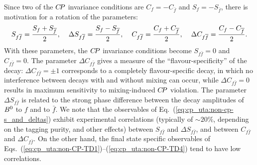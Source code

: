 Since two of the $C\!P$ invariance conditions are 
$C_f = - C_{\bar{f}}$ and $S_f = - S_{\bar{f}}$,
there is motivation for a rotation of the parameters:
\begin{equation}
\label{eq:cp_uta:non-cp-s_and_deltas}
  S_{f\bar{f}} = \frac{S_{f} + S_{\bar{f}}}{2},
  \hspace{4mm}
  \Delta S_{f\bar{f}} = \frac{S_{f} - S_{\bar{f}}}{2},
  \hspace{4mm}
  C_{f\bar{f}} = \frac{C_{f} + C_{\bar{f}}}{2},
  \hspace{4mm}
  \Delta C_{f\bar{f}} = \frac{C_{f} - C_{\bar{f}}}{2}.
\end{equation}
With these parameters, the $C\!P$ invariance conditions become
$S_{f\bar{f}} = 0$ and $C_{f\bar{f}} = 0$. 
The parameter $\Delta C_{f\bar{f}}$ gives a measure of the ``flavour-specificity''
of the decay:
$\Delta C_{f\bar{f}}=\pm1$ corresponds to a completely flavour-specific decay,
in which no interference between decays with and without mixing can occur,
while $\Delta C_{f\bar{f}} = 0$ results in 
maximum sensitivity to mixing-induced $C\!P$ violation.
The parameter $\Delta S_{f\bar{f}}$ is related to the strong phase difference 
between the decay amplitudes of $B^0$ to $f$ and to $\bar f$. 
We note that the observables of Eq.~(\ref{eq:cp_uta:non-cp-s_and_deltas})
exhibit experimental correlations 
(typically of $\sim 20\%$, depending on the tagging purity, and other effects)
between $S_{f\bar{f}}$ and  $\Delta S_{f\bar{f}}$, 
and between $C_{f\bar{f}}$ and $\Delta C_{f\bar{f}}$. 
On the other hand, 
the final state specific observables of Eqs.~(\ref{eq:cp_uta:non-CP-TD1})--(\ref{eq:cp_uta:non-CP-TD4}) tend to have low correlations.

